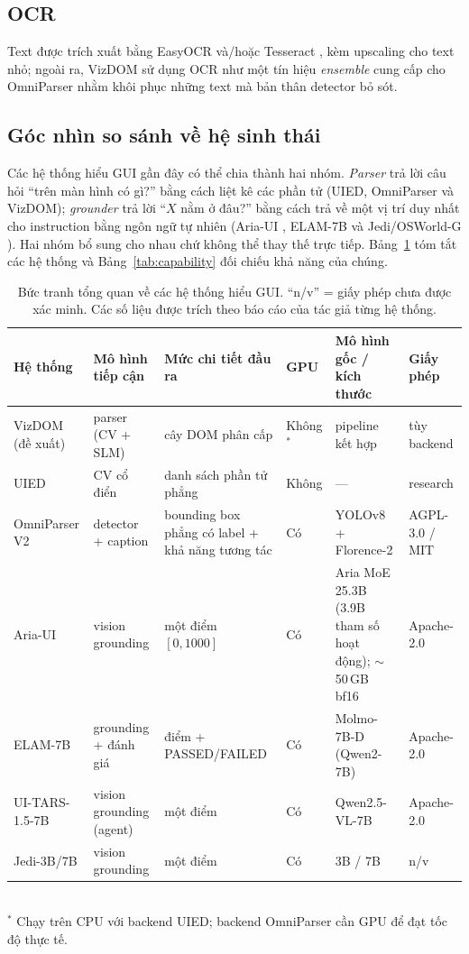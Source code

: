 \documentclass[11pt,a4paper]{article}
\begin{document}
\subsection{OCR}
Text được trích xuất bằng EasyOCR \cite{easyocr} và/hoặc Tesseract
\cite{tesseract}, kèm upscaling cho text nhỏ; ngoài ra, VizDOM sử dụng OCR như một
tín hiệu \emph{ensemble} cung cấp cho OmniParser nhằm khôi phục những text mà bản
thân detector bỏ sót.

\subsection{Góc nhìn so sánh về hệ sinh thái}
Các hệ thống hiểu GUI gần đây có thể chia thành hai nhóm. \emph{Parser} trả lời câu
hỏi ``trên màn hình có gì?'' bằng cách liệt kê các phần tử (UIED, OmniParser và
VizDOM); \emph{grounder} trả lời ``$X$ nằm ở đâu?'' bằng cách trả về một vị trí duy
nhất cho instruction bằng ngôn ngữ tự nhiên (Aria-UI \cite{ariaui2024}, ELAM-7B
\cite{elam7b} và Jedi/OSWorld-G \cite{osworldg}). Hai nhóm bổ sung cho nhau chứ
không thể thay thế trực tiếp. Bảng~\ref{tab:models} tóm tắt các hệ thống và
Bảng~\ref{tab:capability} đối chiếu khả năng của chúng.

\begin{table}[H]
  \centering\footnotesize
  \caption{Bức tranh tổng quan về các hệ thống hiểu GUI. ``n/v'' = giấy phép chưa
  được xác minh. Các số liệu được trích theo báo cáo của tác giả từng hệ thống.}
  \label{tab:models}
  \begin{tabular}{@{}p{2.4cm}p{2.5cm}p{2.7cm}p{0.8cm}p{2.3cm}p{2.0cm}@{}}
    \toprule
    Hệ thống & Mô hình tiếp cận & Mức chi tiết đầu ra & GPU & Mô hình gốc / kích thước & Giấy phép \\
    \midrule
    VizDOM (đề xuất) & parser (CV + SLM) & cây DOM phân cấp & Không$^\ast$ & pipeline kết hợp & tùy backend \\
    UIED & CV cổ điển & danh sách phần tử phẳng & Không & --- & research \\
    OmniParser V2 & detector + caption & bounding box phẳng có label + khả năng tương tác & Có & YOLOv8 + Florence-2 & AGPL-3.0 / MIT \\
    Aria-UI & vision grounding & một điểm $[0,1000]$ & Có & Aria MoE 25.3B (3.9B tham số hoạt động); $\sim$50\,GB bf16 & Apache-2.0 \\
    ELAM-7B & grounding + đánh giá & điểm + PASSED/FAILED & Có & Molmo-7B-D (Qwen2-7B) & Apache-2.0 \\
    UI-TARS-1.5-7B \cite{uitars2025} & vision grounding (agent) & một điểm & Có & Qwen2.5-VL-7B & Apache-2.0 \\
    Jedi-3B/7B & vision grounding & một điểm & Có & 3B / 7B & n/v \\
    \bottomrule
  \end{tabular}\\[0.3em]
  {\footnotesize $^\ast$ Chạy trên CPU với backend UIED; backend OmniParser cần GPU để đạt tốc độ thực tế.}
\end{table}
\end{document}

